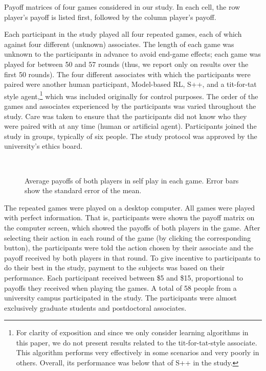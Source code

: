 \documentclass[fleqn,10pt]{SelfArx}
\begin{document}
\begin{table}[t]
	\caption{Payoff matrices of four games considered in our study.  In each cell, the row player's payoff is listed first, followed by the column player's payoff.}
	\label{fig:gameMatrix}
\end{table}

Each participant in the study played all four repeated games, each of which against four different (unknown) associates.  The length of each game was unknown to the participants in advance to avoid end-game effects; each game was played for between 50 and 57 rounds (thus, we report only on results over the first 50 rounds).  The four different associates with which the participants were paired were another human participant, Model-based RL, S++, and a tit-for-tat style agent,\footnote{For clarity of exposition and since we only consider learning algorithms in this paper, we do not present results related to the tit-for-tat-style associate.  This algorithm performs very effectively in some scenarios and very poorly in others.  Overall, its performance was below that of S++ in the study.} which was included originally for control purposes.  The order of the games and associates experienced by the participants was varied throughout the study. Care was taken to ensure that the participants did not know who they were paired with at any time (human or artificial agent).  Participants joined the study in groups, typically of six people. The study protocol was approved by the university's ethics board.

\begin{figure*}
\centering
	 ~~~~~~
	\\
	\caption{Average payoffs of both players in self play in each game.  Error bars show the standard error of the mean.}
\label{fig:selfplay1}
\end{figure*}

The repeated games were played on a desktop computer.  All games were played with perfect information.  That is, participants were shown the payoff matrix on the computer screen, which showed the payoffs of both players in the game.  After selecting their action in each round of the game (by clicking the corresponding button), the participants were told the action chosen by their associate and the payoff received by both players in that round.  To give incentive to participants to do their best in the study, payment to the subjects was based on their performance.  Each participant received between \$5 and \$15, proportional to payoffs they received when playing the games. A total of 58 people from a university campus participated in the study.  The participants were almost exclusively graduate students and postdoctoral associates.
\end{document}
